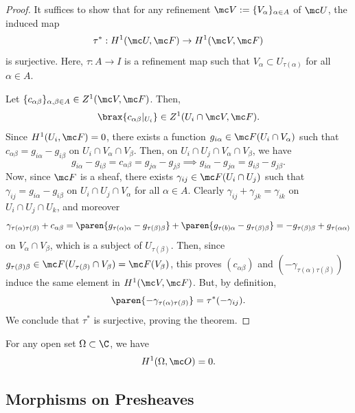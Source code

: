 \documentclass[11pt]{report}
\begin{document}
\begin{proof}
    It suffices to show that for any refinement $\mc V:= \{V_\alpha\}_{\alpha \in A}$ of $\mc U$, the induced map $$\tau^*: H^1(\mc U,\mc F)\to H^1(\mc V,\mc F)$$ is surjective. Here, $\tau:A \to I$ is a refinement map such that $V_\alpha \subset U_{\tau(\alpha)}$ for all $\alpha \in A$.

    Let $\{c_{\alpha \beta}\}_{\alpha,\beta \in A} \in Z^1(\mc V, \mc F)$. Then, 
    \[
    \brax{c_{\alpha \beta}|_{U_i}} \in Z^1(U_i \cap \mc V,\mc F).
    \]
    Since $H^1(U_i,\mc F)=0$, there exists a function $g_{i\alpha} \in \mc F(U_i \cap V_\alpha)$ such that $c_{\alpha \beta}=g_{i\alpha}-g_{i\beta}$ on $U_i \cap V_\alpha \cap V_\beta$. Then, on $U_i \cap U_j \cap V_\alpha \cap V_\beta$, we have
    \[
    g_{i\alpha}-g_{i\beta}=c_{\alpha \beta}=g_{j\alpha}-g_{j\beta} \implies g_{i\alpha}-g_{j\alpha}=g_{i\beta}-g_{j\beta}.
    \]
    Now, since $\mc F$ is a sheaf, there exists $\gamma_{ij} \in \mc F(U_i \cap U_j)$ such that $\gamma_{ij} = g_{i\alpha}-g_{i\beta}$ on $U_i \cap U_j \cap V_\alpha$ for all $\alpha \in A$. Clearly $\gamma_{ij}+\gamma_{jk}=\gamma_{ik}$ on $U_i \cap U_j \cap U_k$, and moreover 
    \[
    \gamma_{\tau(\alpha)\tau(\beta)}+c_{\alpha \beta}=\paren{g_{\tau(\alpha)\alpha}-g_{\tau(\beta)\beta}}+\paren{g_{\tau(b)\alpha }-g_{\tau (\beta)\beta}}= -g_{\tau(\beta)\beta} + g_{\tau(\alpha \alpha)}
    \]
    on $V_\alpha \cap V_\beta$, which is a subject of $U_{\tau(\beta)}$. Then, since $g_{\tau(\beta)\beta} \in \mc F(U_{\tau (\beta)}\cap V_\beta)=\mc F(V _\beta)$, this proves $(c_{\alpha \beta})$ and $(-\gamma_{\tau(\alpha)\tau(\beta)})$ induce the same element in $H^1(\mc V, \mc F)$. But, by definition,
    \[
    \paren{-\gamma _{\tau(\alpha)\tau(\beta)}}=\tau^*(-\gamma_{ij}).
    \]
    We conclude that $\tau^*$ is surjective, proving the theorem.
\end{proof}

\begin{cor}
    For any open set $\Omega \subset \C$, we have
    \[
    H^1(\Omega, \mc O) = 0.
    \]
\end{cor}

\subsection{Morphisms on Presheaves}
\end{document}
